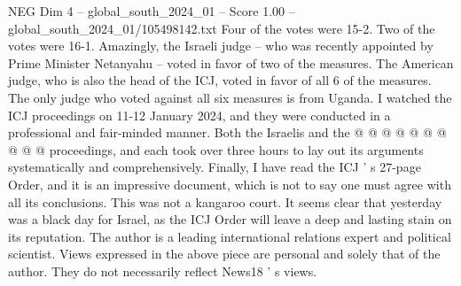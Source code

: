 \begin{textsample}{NEG Dim 4 – global\_south\_2024\_01 – Score 1.00 – global\_south\_2024\_01/105498142.txt}
Four of the votes were 15-2.
Two of the votes were 16-1.
Amazingly, the Israeli judge -- who was recently appointed by Prime Minister Netanyahu -- voted in favor of two of the measures.
The American judge, who is also the head of the ICJ, voted in favor of all 6 of the measures.
The only judge who voted against all six measures is from Uganda.
I watched the ICJ proceedings on 11-12 January 2024, and they were conducted in a professional and fair-minded manner.
Both the Israelis and the @ @ @ @ @ @ @ @ @ @ proceedings, and each took over three hours to lay out its arguments systematically and comprehensively.
Finally, I have read the ICJ ' s 27-page Order, and it is an impressive document, which is not to say one must agree with all its conclusions.
This was not a kangaroo court.
It seems clear that yesterday was a black day for Israel, as the ICJ Order will leave a deep and lasting stain on its reputation.
The author is a leading international relations expert and political scientist.
Views expressed in the above piece are personal and solely that of the author.
They do not necessarily reflect News18 ' s views.

\end{textsample}
